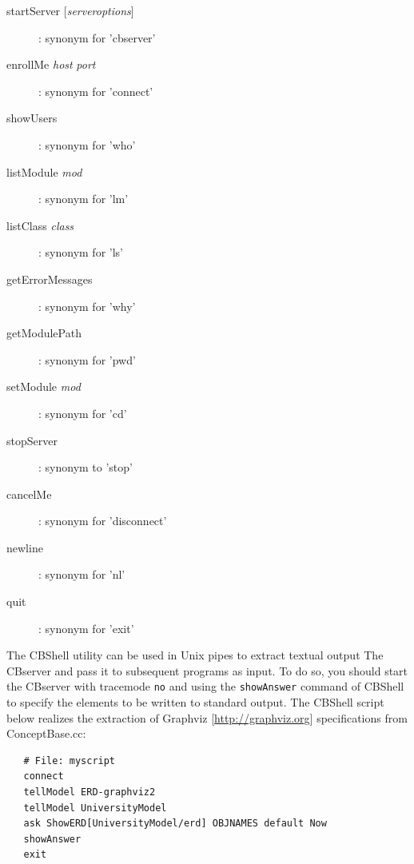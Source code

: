 \begin{description}

\item[{startServer [{\it serveroptions}]}] :
      synonym for 'cbserver'

\item[enrollMe {\it host} {\it port}] :
      synonym for 'connect'

\item[showUsers] :
      synonym for 'who'

\item[listModule {\it mod}] :
      synonym for 'lm'

\item[listClass {\it class}] :
      synonym for 'ls'

\item[getErrorMessages] :
      synonym for 'why'

\item[getModulePath] :
      synonym for 'pwd'

\item[setModule {\it mod}] :
      synonym for 'cd'

\item[stopServer] :
      synonym to 'stop'

\item[cancelMe] :
      synonym for 'disconnect'

\item[newline] :
      synonym for 'nl'

\item[quit] :
     synonym for 'exit'

\end{description}

The CBShell utility can be used in Unix pipes to extract textual output The CBserver and
pass it to subsequent programs as input. To do so, you should start the CBserver with
tracemode {\tt no} and using the {\tt showAnswer}  command of CBShell to specify the elements
to be written to standard output. The CBShell script below realizes the extraction of 
Graphviz [\url{http://graphviz.org}] specifications from ConceptBase.cc:

\begin{verbatim}
   # File: myscript
   connect
   tellModel ERD-graphviz2
   tellModel UniversityModel
   ask ShowERD[UniversityModel/erd] OBJNAMES default Now
   showAnswer
   exit
\end{verbatim}



